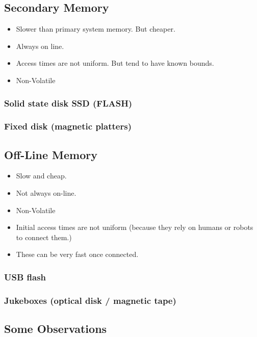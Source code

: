 \documentclass[10pt]{article}
\begin{document}
\subsection{Secondary Memory}
\begin{itemize}
\item Slower than primary system memory. But cheaper. 
\item Always on line.
\item Access times are not uniform. But tend to have known bounds.
\item Non-Volatile
\end{itemize}

\subsubsection{Solid state disk SSD (FLASH)}
\subsubsection{Fixed disk (magnetic platters)}


\subsection{Off-Line Memory}
\begin{itemize}
\item Slow and cheap.  
\item Not always on-line.  
\item Non-Volatile
\item Initial access times are not uniform (because they rely on humans or robots to connect them.)
\item These can be very fast once connected.
\end{itemize}

\subsubsection{USB flash}
\subsubsection{Jukeboxes (optical disk / magnetic tape)}


\subsection{Some Observations}
\end{document}
